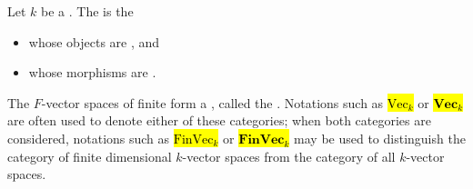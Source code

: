 \begin{definition} \label{definition:category_of_vector_spaces_over_a_field}
    Let $k$ be a . The  is the  
    \begin{itemize}
        \item whose objects are , and
        \item whose morphisms are .
    \end{itemize}

    The $F$-vector spaces of finite  form a , called the . Notations such as \hl{$\mathrm{Vec}_k$} or \hl{$\mathbf{Vec}_k$} are often used to denote either of these categories; when both categories are considered, notations such as \hl{$\mathrm{FinVec}_k$} or \hl{$\mathbf{FinVec}_k$} may be used to distinguish the category of finite dimensional $k$-vector spaces from the category of all $k$-vector spaces.
\end{definition}